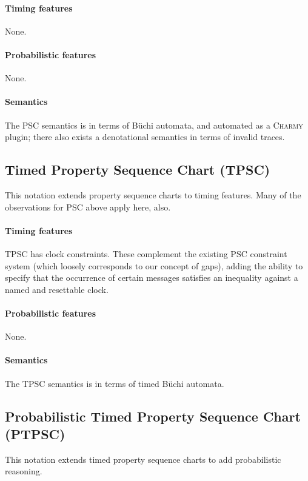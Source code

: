 \paragraph{Timing features}
None.

\paragraph{Probabilistic features}
None.

\paragraph{Semantics}
The PSC semantics is in terms of B\"uchi automata, and automated as a
\textsc{Charmy} plugin; there also exists a denotational semantics in terms of
invalid traces.

\subsection{Timed Property Sequence Chart (TPSC)}
This notation extends property sequence charts to timing features.  Many
of the observations for PSC above apply here, also.

\paragraph{Timing features}
TPSC has clock constraints.  These complement the existing PSC constraint system
(which loosely corresponds to our concept of gaps), adding the ability to
specify that the occurrence of certain messages satisfies an inequality against
a named and resettable clock.

\paragraph{Probabilistic features}
None.

\paragraph{Semantics}
The TPSC semantics is in terms of timed B\"uchi automata.

\subsection{Probabilistic Timed Property Sequence Chart (PTPSC)}
This notation extends timed property sequence charts to add probabilistic
reasoning.

